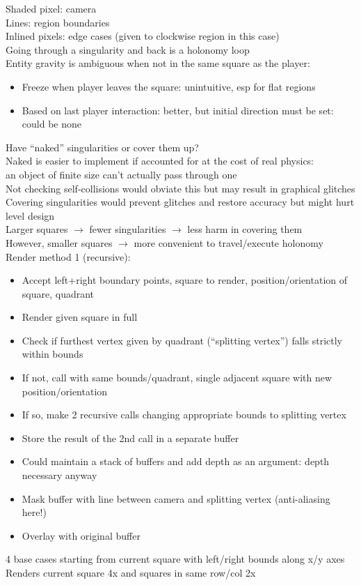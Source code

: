 \documentclass{article}
\begin{document}
Shaded pixel: camera \\
Lines: region boundaries \\
Inlined pixels: edge cases (given to clockwise region in this case) \\
Going through a singularity and back is a holonomy loop \\
Entity gravity is ambiguous when not in the same square as the player:
\begin{itemize}
  \item
    Freeze when player leaves the square: unintuitive, esp for flat regions
  \item
    Based on last player interaction: better, but initial direction must be set:
    could be none
\end{itemize}
Have ``naked'' singularities or cover them up? \\
Naked is easier to implement if accounted for
at the cost of real physics: \\
an object of finite size can't actually pass through one \\
Not checking self-collisions would obviate this
but may result in graphical glitches \\
Covering singularities would prevent glitches and restore accuracy
but might hurt level design \\
Larger squares $\rightarrow$ fewer singularities $\rightarrow$ less harm in covering them \\
However, smaller squares $\rightarrow$ more convenient to travel/execute holonomy \\

Render method 1 (recursive):
\begin{itemize}
\item
  Accept left+right boundary points, square to render,
  position/orientation of square, quadrant
\item
  Render given square in full
\item
  Check if furthest vertex given by quadrant (``splitting vertex'') falls strictly within bounds
\item
  If not, call with same bounds/quadrant,
  single adjacent square with new position/orientation
\item
  If so, make 2 recursive calls changing appropriate bounds to splitting vertex
\item
  Store the result of the 2nd call in a separate buffer
\item
  Could maintain a stack of buffers and add depth as an argument: depth necessary anyway
\item
  Mask buffer with line between camera and splitting vertex (anti-aliasing here!)
\item
  Overlay with original buffer
\end{itemize}
4 base cases starting from current square with left/right bounds along x/y axes \\
Renders current square 4x and squares in same row/col 2x \\
\end{document}
